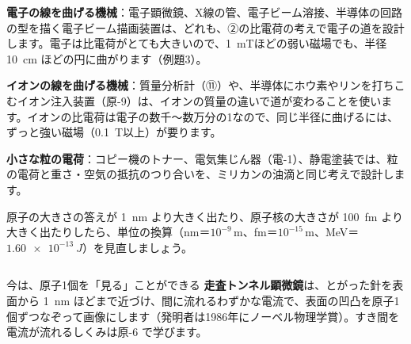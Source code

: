 \begin{phkougaku}
\textbf{電子の線を曲げる機械}：電子顕微鏡、X線の管、電子ビーム溶接、半導体の回路の型を描く電子ビーム描画装置は、どれも、②の比電荷の考えで電子の道を設計します。電子は比電荷がとても大きいので、\qty{1}{mT}ほどの弱い磁場でも、半径 \qty{10}{cm} ほどの円に曲がります（例題3）。

\textbf{イオンの線を曲げる機械}：質量分析計（⑪）や、半導体にホウ素やリンを打ちこむイオン注入装置（原-9）は、イオンの質量の違いで道が変わることを使います。イオンの比電荷は電子の数千〜数万分の1なので、同じ半径に曲げるには、ずっと強い磁場（\qty{0.1}{T}以上）が要ります。

\textbf{小さな粒の電荷}：コピー機のトナー、電気集じん器（電-1）、静電塗装では、粒の電荷と重さ・空気の抵抗のつり合いを、ミリカンの油滴と同じ考えで設計します。

\begin{phketa}[原子と電子の数の目安]
原子の大きさの答えが \qty{1}{nm} より大きく出たり、原子核の大きさが \qty{100}{fm} より大きく出たりしたら、単位の換算（nm＝$10^{-9}$\,m、fm＝$10^{-15}$\,m、MeV＝$\qty{1.60e-13}{J}$）を見直しましょう。
\end{phketa}
\end{phkougaku}

\begin{column}{今は、原子1個を「見る」ことができる}
\textbf{走査トンネル顕微鏡}は、とがった針を表面から \qty{1}{nm} ほどまで近づけ、間に流れるわずかな電流で、表面の凹凸を原子1個ずつなぞって画像にします（発明者は1986年にノーベル物理学賞）。すき間を電流が流れるしくみは原-6 で学びます。
\end{column}

